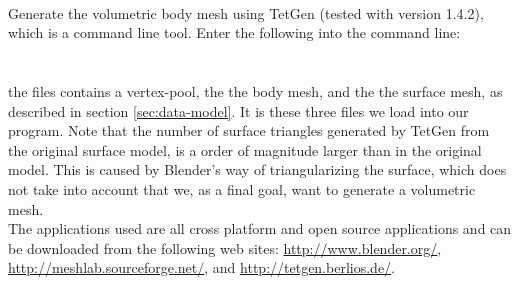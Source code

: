  \\

Generate the volumetric body mesh using TetGen (tested with
version 1.4.2), which is a command line tool. Enter the following into
the command line: \\

 \\

\\

the  files contains a vertex-pool, the  the
body mesh, and the  the surface mesh, as described in
section \vref{sec:data-model}. It is these three files we load into our
program.
Note that the number of surface triangles generated by TetGen from the
original surface model, is a order of magnitude larger than in the
original model. This is caused by Blender's way of triangularizing the
surface, which does not take into account that we, as a final goal, want
to generate a volumetric mesh.
\\

The applications used are all cross platform and open source
applications and can be downloaded from the following web sites:
\url{http://www.blender.org/},
\url{http://meshlab.sourceforge.net/}, and
\url{http://tetgen.berlios.de/}.
